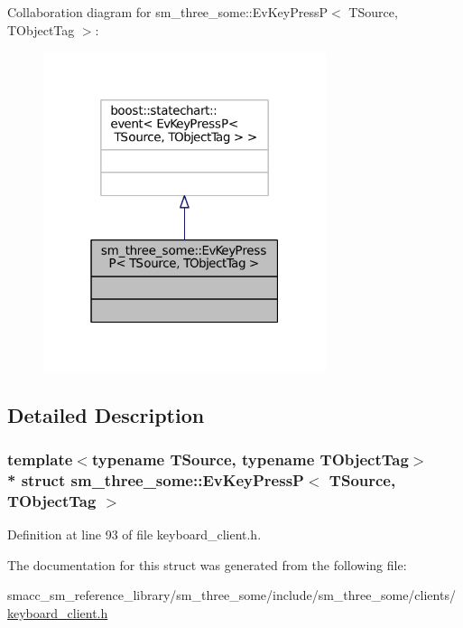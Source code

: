 Collaboration diagram for sm\+\_\+three\+\_\+some\+:\+:Ev\+Key\+PressP$<$ T\+Source, T\+Object\+Tag $>$\+:
\nopagebreak
\begin{figure}[H]
\begin{center}
\leavevmode
\includegraphics[width=235pt]{structsm__three__some_1_1EvKeyPressP__coll__graph}
\end{center}
\end{figure}


\subsection{Detailed Description}
\subsubsection*{template$<$typename T\+Source, typename T\+Object\+Tag$>$\\*
struct sm\+\_\+three\+\_\+some\+::\+Ev\+Key\+Press\+P$<$ T\+Source, T\+Object\+Tag $>$}



Definition at line 93 of file keyboard\+\_\+client.\+h.



The documentation for this struct was generated from the following file\+:\begin{DoxyCompactItemize}
\item 
smacc\+\_\+sm\+\_\+reference\+\_\+library/sm\+\_\+three\+\_\+some/include/sm\+\_\+three\+\_\+some/clients/\hyperlink{keyboard__client_8h}{keyboard\+\_\+client.\+h}\end{DoxyCompactItemize}
